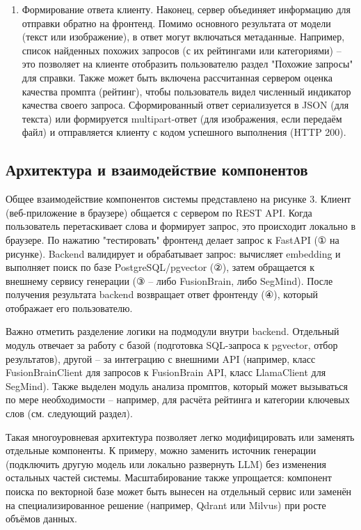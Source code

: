 \begin{enumerate}[label=\arabic*.]
\item Формирование ответа клиенту. Наконец, сервер объединяет информацию для отправки обратно на фронтенд. Помимо основного результата от модели (текст или изображение), в ответ могут включаться метаданные. Например, список найденных похожих запросов (с их рейтингами или категориями) – это позволяет на клиенте отобразить пользователю раздел "Похожие запросы" для справки. Также может быть включена рассчитанная сервером оценка качества промпта (рейтинг), чтобы пользователь видел численный индикатор качества своего запроса. Сформированный ответ сериализуется в JSON (для текста) или формируется multipart-ответ (для изображения, если передаём файл) и отправляется клиенту с кодом успешного выполнения (HTTP 200).

\end{enumerate}

\subsection{Архитектура и взаимодействие компонентов}

Общее взаимодействие компонентов системы представлено на рисунке 3. Клиент (веб-приложение в браузере) общается с сервером по REST API. Когда пользователь перетаскивает слова и формирует запрос, это происходит локально в браузере. По нажатию "тестировать" фронтенд делает запрос к FastAPI (① на рисунке). Backend валидирует и обрабатывает запрос: вычисляет embedding и выполняет поиск по базе PostgreSQL/pgvector (②), затем обращается к внешнему сервису генерации (③ – либо FusionBrain, либо SegMind). После получения результата backend возвращает ответ фронтенду (④), который отображает его пользователю.

Важно отметить разделение логики на подмодули внутри backend. Отдельный модуль отвечает за работу с базой (подготовка SQL-запроса к pgvector, отбор результатов), другой – за интеграцию с внешними API (например, класс FusionBrainClient для запросов к FusionBrain API, класс LlamaClient для SegMind). Также выделен модуль анализа промптов, который может вызываться по мере необходимости – например, для расчёта рейтинга и категории ключевых слов (см. следующий раздел).

Такая многоуровневая архитектура позволяет легко модифицировать или заменять отдельные компоненты. К примеру, можно заменить источник генерации (подключить другую модель или локально развернуть LLM) без изменения остальных частей системы. Масштабирование также упрощается: компонент поиска по векторной базе может быть вынесен на отдельный сервис или заменён на специализированное решение (например, Qdrant или Milvus) при росте объёмов данных.

